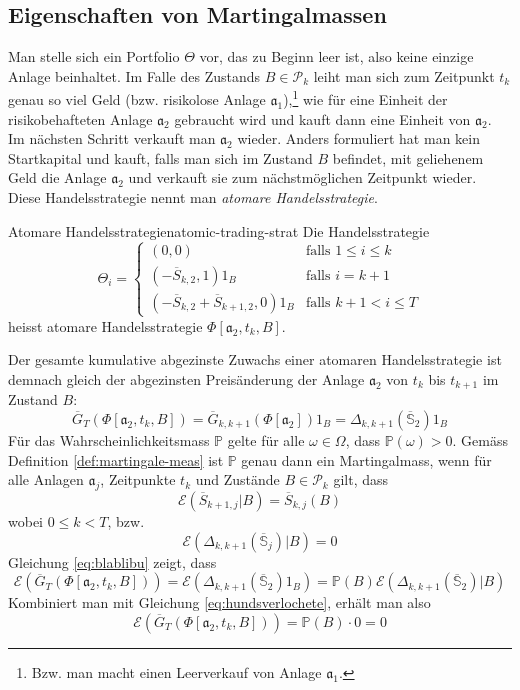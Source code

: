 \documentclass[11pt]{report} %
\begin{document}
\subsection{Eigenschaften von Martingalmassen}
Man stelle sich ein Portfolio $\Theta$ vor, das zu Beginn leer ist, also keine einzige Anlage beinhaltet. Im Falle des Zustands $B \in \mathcal{P}_k$ leiht man sich zum Zeitpunkt $t_k$ genau so viel Geld (bzw. risikolose Anlage $\mathfrak{a}_1$),\footnote{Bzw. man macht einen Leerverkauf von Anlage $\mathfrak{a}_1$.} wie für eine Einheit der risikobehafteten Anlage $\mathfrak{a}_2$ gebraucht wird und kauft dann eine Einheit von $\mathfrak{a}_2$. Im nächsten Schritt verkauft man $\mathfrak{a}_2$ wieder. Anders formuliert hat man kein Startkapital und kauft, falls man sich im Zustand $B$ befindet, mit geliehenem Geld die Anlage $\mathfrak{a}_2$ und verkauft sie zum nächstmöglichen Zeitpunkt wieder. Diese Handelsstrategie nennt man \textit{atomare Handelsstrategie}.
\begin{Definition}{Atomare Handelsstrategien}{atomic-trading-strat}
    Die Handelsstrategie
    $$\Theta_i=\begin{cases}
        (0,0) & \text{falls } 1\leq i \leq k\\  
        (-\overline{S}_{k, 2}, 1)1_B & \text{falls } i=k+1\\
        (-\overline{S}_{k, 2}+\overline{S}_{k+1, 2}, 0)1_B & \text{falls } k+1<i\leq T
    \end{cases}$$ heisst atomare Handelsstrategie $\Phi[\mathfrak{a}_2, t_k, B]$.
\end{Definition}
Der gesamte kumulative abgezinste Zuwachs einer atomaren Handelsstrategie ist demnach gleich der abgezinsten Preisänderung der Anlage $\mathfrak{a}_2$ von $t_k$ bis $t_{k+1}$ im Zustand $B$: \begin{equation} \label{eq:blablibu}
    \overline{G}_T(\Phi[\mathfrak{a}_2, t_k, B])=\overline{G}_{k, k+1}(\Phi[\mathfrak{a}_2])1_B=\Delta_{k, k+1}(\overline{\mathbb{S}}_2)1_B
\end{equation}
Für das Wahrscheinlichkeitsmass $\mathbb{P}$ gelte für alle $\omega \in \Omega$, dass $\mathbb{P}(\omega)>0$. Gemäss Definition \ref{def:martingale-meas} ist $\mathbb{P}$ genau dann ein Martingalmass, wenn für alle Anlagen $\mathfrak{a}_j$, Zeitpunkte $t_k$ und Zustände $B \in \mathcal{P}_k$ gilt, dass $$\mathcal{E}(\overline{S}_{k+1, j}|B)=\overline{S}_{k, j}(B)$$ wobei $0 \leq k < T$, bzw. \begin{equation}\label{eq:hundsverlochete}
    \mathcal{E}(\Delta_{k, k+1}(\overline{\mathbb{S}}_j)|B)=0 
\end{equation}
Gleichung \ref{eq:blablibu} zeigt, dass 
$$\mathcal{E}(\overline{G}_T(\Phi[\mathfrak{a}_2, t_k, B]))=\mathcal{E}(\Delta_{k, k+1}(\overline{\mathbb{S}}_2)1_B)=\mathbb{P}(B)\mathcal{E}(\Delta_{k, k+1}(\overline{\mathbb{S}}_2)|B)$$
Kombiniert man mit Gleichung \ref{eq:hundsverlochete}, erhält man also 
$$\mathcal{E}(\overline{G}_T(\Phi[\mathfrak{a}_2, t_k, B]))=\mathbb{P}(B)\cdot0=0 $$
\end{document}
